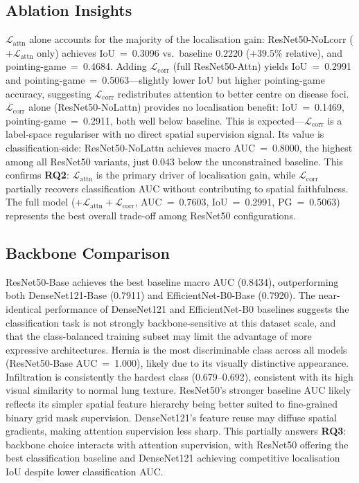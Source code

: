 \documentclass[12pt, a4paper]{article}
\begin{document}
\subsection{Ablation Insights}

$\mathcal{L}_{\text{attn}}$ alone accounts for the majority of the localisation gain:
ResNet50-NoLcorr ($+\mathcal{L}_{\text{attn}}$ only) achieves IoU~=~0.3096 vs.\
baseline 0.2220 ($+39.5\%$ relative), and pointing-game~=~0.4684. Adding
$\mathcal{L}_{\text{corr}}$ (full ResNet50-Attn) yields IoU~=~0.2991 and
pointing-game~=~0.5063---slightly lower IoU but higher pointing-game accuracy,
suggesting $\mathcal{L}_{\text{corr}}$ redistributes attention to better centre on
disease foci. $\mathcal{L}_{\text{corr}}$ alone (ResNet50-NoLattn) provides no
localisation benefit: IoU~=~0.1469, pointing-game~=~0.2911, both well below baseline.
This is expected---$\mathcal{L}_{\text{corr}}$ is a label-space regulariser with no
direct spatial supervision signal. Its value is classification-side: ResNet50-NoLattn
achieves macro AUC~=~0.8000, the highest among all ResNet50 variants, just 0.043 below
the unconstrained baseline. This confirms \textbf{RQ2}: $\mathcal{L}_{\text{attn}}$ is
the primary driver of localisation gain, while $\mathcal{L}_{\text{corr}}$ partially
recovers classification AUC without contributing to spatial faithfulness. The full model
($+\mathcal{L}_{\text{attn}}+\mathcal{L}_{\text{corr}}$, AUC~=~0.7603,
IoU~=~0.2991, PG~=~0.5063) represents the best overall trade-off among ResNet50
configurations.

\subsection{Backbone Comparison}

ResNet50-Base achieves the best baseline macro AUC (0.8434), outperforming both
DenseNet121-Base (0.7911) and EfficientNet-B0-Base (0.7920). The near-identical
performance of DenseNet121 and EfficientNet-B0 baselines suggests the classification task
is not strongly backbone-sensitive at this dataset scale, and that the class-balanced
training subset may limit the advantage of more expressive architectures. Hernia is the
most discriminable class across all models (ResNet50-Base AUC~=~1.000), likely due to its
visually distinctive appearance. Infiltration is consistently the hardest class
(0.679--0.692), consistent with its high visual similarity to normal lung texture.
ResNet50's stronger baseline AUC likely reflects its simpler spatial feature hierarchy
being better suited to fine-grained binary grid mask supervision. DenseNet121's feature
reuse may diffuse spatial gradients, making attention supervision less sharp. This
partially answers \textbf{RQ3}: backbone choice interacts with attention supervision,
with ResNet50 offering the best classification baseline and DenseNet121 achieving
competitive localisation IoU despite lower classification AUC.
\end{document}
